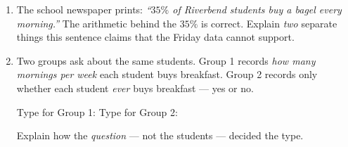 \documentclass[10pt]{article}
\begin{document}
\vspace{0.08in}

\boxguard
\begin{extensionbox}
\small
\begin{enumerate}[leftmargin=1.6em, itemsep=5pt, topsep=2pt]

  \item The school newspaper prints: \textit{``$35\%$ of Riverbend students buy a bagel
        every morning.''} The arithmetic behind the $35\%$ is correct. Explain \emph{two}
        separate things this sentence claims that the Friday data cannot support.

  \item Two groups ask about the same students. Group 1 records \emph{how many mornings
        per week} each student buys breakfast. Group 2 records only whether each student
        \emph{ever} buys breakfast --- yes or no.

        Type for Group 1:  \hfill Type for Group 2: 

        Explain how the \emph{question} --- not the students --- decided the type.

\end{enumerate}
\end{extensionbox}
\end{document}
